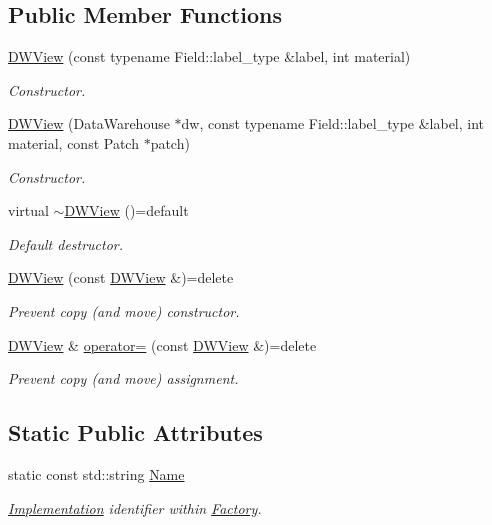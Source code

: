 \subsection*{Public Member Functions}
\begin{DoxyCompactItemize}
\item 
\hyperlink{classUintah_1_1PhaseField_1_1DWView_af33d78220bb536a0402193528a1554ec}{D\+W\+View} (const typename Field\+::label\+\_\+type \&label, int material)
\begin{DoxyCompactList}\small\item\em Constructor. \end{DoxyCompactList}\item 
\hyperlink{classUintah_1_1PhaseField_1_1DWView_a47a9d33336fa123747e3f8df85845be3}{D\+W\+View} (Data\+Warehouse $\ast$dw, const typename Field\+::label\+\_\+type \&label, int material, const Patch $\ast$patch)
\begin{DoxyCompactList}\small\item\em Constructor. \end{DoxyCompactList}\item 
virtual \hyperlink{classUintah_1_1PhaseField_1_1DWView_aed5d078b494642944456fa8fa792f22e}{$\sim$\+D\+W\+View} ()=default
\begin{DoxyCompactList}\small\item\em Default destructor. \end{DoxyCompactList}\item 
\hyperlink{classUintah_1_1PhaseField_1_1DWView_a41304332233ca34306f52560a8830207}{D\+W\+View} (const \hyperlink{classUintah_1_1PhaseField_1_1DWView}{D\+W\+View} \&)=delete
\begin{DoxyCompactList}\small\item\em Prevent copy (and move) constructor. \end{DoxyCompactList}\item 
\hyperlink{classUintah_1_1PhaseField_1_1DWView}{D\+W\+View} \& \hyperlink{classUintah_1_1PhaseField_1_1DWView_a71239df8adf25f9af2d5f3dc4754722c}{operator=} (const \hyperlink{classUintah_1_1PhaseField_1_1DWView}{D\+W\+View} \&)=delete
\begin{DoxyCompactList}\small\item\em Prevent copy (and move) assignment. \end{DoxyCompactList}\end{DoxyCompactItemize}
\subsection*{Static Public Attributes}
\begin{DoxyCompactItemize}
\item 
static const std\+::string \hyperlink{classUintah_1_1PhaseField_1_1DWView_ac73a7615df07e872d793511a215dd599}{Name}
\begin{DoxyCompactList}\small\item\em \hyperlink{classUintah_1_1PhaseField_1_1Implementation}{Implementation} identifier within \hyperlink{classUintah_1_1PhaseField_1_1Factory}{Factory}. \end{DoxyCompactList}\end{DoxyCompactItemize}

